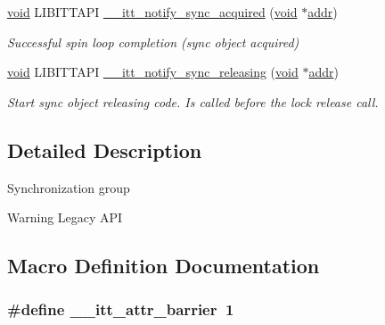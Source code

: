 \begin{DoxyCompactItemize}
\hyperlink{ittnotify__static_8h_af941d56e55e3c5465135b60c4d6343ed}{void} L\-I\-B\-I\-T\-T\-A\-P\-I \hyperlink{group__legacy__sync_gac781d21056c5e4a50ed939eff306e155}{\-\_\-\-\_\-itt\-\_\-notify\-\_\-sync\-\_\-acquired} (\hyperlink{ittnotify__static_8h_af941d56e55e3c5465135b60c4d6343ed}{void} $\ast$\hyperlink{ittnotify__static_8h_a7e21c61c16fffcc27199a9d66ff39ab8}{addr})
\begin{DoxyCompactList}\small\item\em Successful spin loop completion (sync object acquired) \end{DoxyCompactList}\item 
\hyperlink{ittnotify__static_8h_af941d56e55e3c5465135b60c4d6343ed}{void} L\-I\-B\-I\-T\-T\-A\-P\-I \hyperlink{group__legacy__sync_ga6235d3f0e928b27b3fa2ac8e707f4735}{\-\_\-\-\_\-itt\-\_\-notify\-\_\-sync\-\_\-releasing} (\hyperlink{ittnotify__static_8h_af941d56e55e3c5465135b60c4d6343ed}{void} $\ast$\hyperlink{ittnotify__static_8h_a7e21c61c16fffcc27199a9d66ff39ab8}{addr})
\begin{DoxyCompactList}\small\item\em Start sync object releasing code. Is called before the lock release call. \end{DoxyCompactList}\end{DoxyCompactItemize}


\subsection{Detailed Description}
Synchronization group \begin{DoxyWarning}{Warning}
Legacy A\-P\-I 
\end{DoxyWarning}


\subsection{Macro Definition Documentation}
\hypertarget{group__legacy__sync_gaa2de2b08cecad1d567b5312c503ad217}{
\subsubsection[{\-\_\-\-\_\-itt\-\_\-attr\-\_\-barrier}]{\setlength{\rightskip}{0pt plus 5cm}\#define \-\_\-\-\_\-itt\-\_\-attr\-\_\-barrier~1}}\label{group__legacy__sync_gaa2de2b08cecad1d567b5312c503ad217}


